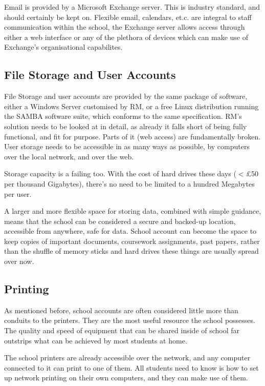 \documentclass[a4paper,leqno,titlepage]{article}
\begin{document}
Email is provided by a Microsoft Exchange server. This is industry standard, and
should certainly be kept on. Flexible email, calendars, et.c. are integral
to staff communication within the school, the Exchange server allows access
through either a web interface or any of the plethora of devices which
can make use of Exchange's organisational capabilites.


\subsection{File Storage and User Accounts}

File Storage and user accounts are provided by the same package of software,
either a Windows Server customised by RM, or a free Linux distribution
running the SAMBA software suite, which conforms to the same specification.
RM's solution needs to be looked at in detail, as already it falls short of
being fully functional, and fit for purpose. Parts of it (web access) are
fundamentally broken. User storage needs to be accessible in as many ways
as possible, by computers over the local network, and over the web.


Storage capacity is a failing too. With the cost of hard drives
these days ($<$£50 per thousand Gigabytes), there's no need to be limited to
a hundred Megabytes per user.


A larger and more flexible space for storing data, combined with simple
guidance, means that the school can be considered a secure and backed-up
location, accessible from anywhere, safe for data.
School account can become the space to keep copies of important documents,
coursework assignments, past papers, rather than the shuffle of memory sticks
and hard drives these things are usually spread over now.


\subsection{Printing}

As mentioned before, school accounts are often considered little more than
conduits to the printers. They are the most useful resource the school
possesses. The quality and speed of equipment that can be shared inside of
school far outstrips what can be achieved by most students at home.


The school printers are already accessible over the network, and any computer
connected to it can print to one of them. All students need to know is how to
set up network printing on their own computers, and they can make use of them.
\end{document}
